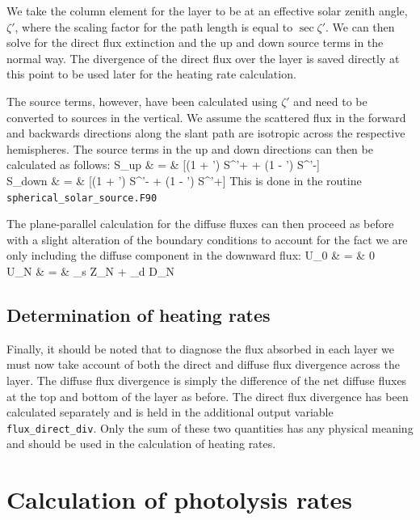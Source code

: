 \noindent
We take the column element for the layer to be at an effective solar
zenith angle, $\zeta'$, where the scaling factor for the path length is
equal to $\sec \zeta'$. We can then solve for the direct flux extinction
and the up and down source terms in the normal way.
The divergence of the direct flux over the layer is saved directly at this
point to be used later for the heating rate calculation.

\noindent
The source terms, however, have been calculated using $\zeta'$ and need
to be converted to sources in the vertical. We assume the scattered flux in
the forward and backwards directions along the slant path are isotropic across
the respective hemispheres. The source terms in the up and down directions can
then be calculated as follows:
\beqn
S_{up} & = &  [(1 + \cos \zeta \sec \zeta') S^{'+} + (1 - \cos \zeta \sec \zeta') S^{'-}]
  \nonumber \\
S_{down} & = &  [(1 + \cos \zeta \sec \zeta') S^{'-} + (1 - \cos \zeta \sec \zeta') S^{'+}]
\eeqn
\noindent
This is done in the routine {\tt spherical\_solar\_source.F90}

\noindent
The plane-parallel calculation for the diffuse fluxes can then proceed as
before with a slight alteration of the boundary conditions to account for the
fact we are only including the diffuse component in the downward flux:
\beqn
U_0 & = & 0 \nonumber \\
U_{N} & = & \alpha_{s} Z_{N} + \alpha_{d} D_{N}
\eeqn 

\subsection{Determination of heating rates}

Finally, it should be noted that to diagnose the flux absorbed in each layer
we must now take account of both the direct and diffuse flux divergence across
the layer. The diffuse flux divergence is simply the difference of the net
diffuse fluxes at the top and bottom of the layer as before. The direct flux
divergence has been calculated separately and is held in the additional output
variable {\tt flux\_direct\_div}. Only the sum of these two quantities has any
physical meaning and should be used in the calculation of heating rates.


\section{Calculation of photolysis rates}

